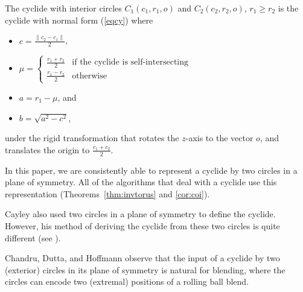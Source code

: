 \begin{lemma}
The cyclide with interior circles $C_1(c_1,r_1,o)$
and $C_2(c_2,r_2,o)$, $r_1 \geq r_2$
is the cyclide with normal form (\ref{eqcy}) where
\begin{itemize}
\item
	$c = \frac{\|c_2 - c_1\|}{2}$, 
\item
	$\mu = \left\{ \begin{array}{ll}
	\frac{r_1 + r_2}{2} & \mbox{if the cyclide is self-intersecting} \\
	\frac{r_1 - r_2}{2} & \mbox{otherwise}
	\end{array}
	\right.$
\item
	$a = r_1 - \mu$, and 
\item
	$b = \sqrt{a^2 - c^2}$,
\end{itemize}
under the rigid transformation that rotates the $z$-axis to the
vector $o$, and translates the origin to $\frac{c_1 + c_2}{2}$.
%
%
\end{lemma}

\begin{rmk}
In this paper, we are consistently able to represent a cyclide 
by two circles in a plane of symmetry.  All of the algorithms
that deal with a cyclide use this representation (Theorems~\ref{thm:invtorus} 
and \ref{cor:coi}).

Cayley also used two circles in a plane of symmetry to define the cyclide.
However, his method of deriving the cyclide from these two circles is 
quite different (see \cite[p. 285]{CDH89a}).

Chandru, Dutta, and Hoffmann \cite{CDH89a} observe that the input of a
cyclide by two (exterior) circles in its plane of symmetry is natural 
for blending, where the circles can encode two (extremal) positions
of a rolling ball blend.
\end{rmk}

